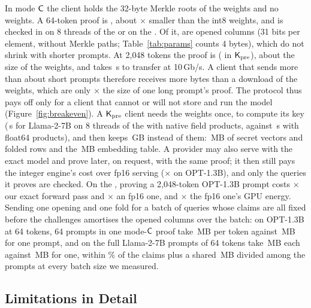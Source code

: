  In mode $\mathsf{C}$ the client holds the 32-byte Merkle roots of the weights and no weights.
A 64-token proof is \ProofLlamaShortC{}, about \ProofRatioLlamaShort{}$\times$ smaller than the int8
weights, and is checked in \VerifyLlamaShortCCpu{} on 8 threads of the \PlatformCpu{} or
\VerifyLlamaShortCGpu{} on the \PlatformGpu{}. Of it, \ColumnsLlamaShort{} are opened columns (31 bits per element, without Merkle paths;
Table~\ref{tab:params} counts 4 bytes), which do not shrink with shorter prompts. At 2{,}048 tokens the proof is \ProofLlamaLongC{}
(\ProofLlamaLongK{} in $\mathsf{K}_{\mathrm{pre}}$), about the size of the weights, and takes \TransferLlamaLong{}\,s to
transfer at 10\,Gb/s. A client that sends more than about \BreakevenQueriesShort{} short prompts
therefore receives more bytes than a download of the weights, which are only
\BreakevenQueriesLong{}$\times$ the size of one long prompt's proof. The protocol thus pays off only for a
client that cannot or will not store and run the model (Figure~\ref{fig:breakeven}). A $\mathsf{K}_{\mathrm{pre}}$ client needs the weights once, to compute its key
(\KpreKeyLlama{}\,s for Llama-2-7B on 8 threads of the \PlatformCpu{} with native field products, against
\KpreKeyLlamaBefore{}\,s with float64 products), and then keeps \KpreStoreGB{}\,GB instead of them:
\KpreKeyMB{}\,MB of secret vectors and folded rows and the \KpreEmbedMB{}\,MB embedding table. A provider may also serve with the exact model and prove
later, on request, with the same proof; it then still pays the integer engine's cost over fp16
serving (\ServeOptMUOneOverUTwo{}$\times$ on OPT-1.3B), and only the queries it proves are checked. On the \PlatformGpu{}, proving a 2{,}048-token OPT-1.3B prompt costs
\ServeOptMOverUOneRange{}$\times$ our exact forward pass and \ServeOptMOverUTwoRange{}$\times$ an fp16 one\TodoServingExt{}, and
\ServeOptMEnergyOverUTwoRange{}$\times$ the fp16 one's GPU energy. Sending one opening and one fold for a batch of
queries whose claims are all fixed before the challenges amortises the opened columns over the
batch: on OPT-1.3B at 64 tokens, 64 prompts in one mode-$\mathsf{C}$ proof take \ServeBatchMBPerTokenC{}\,MB per token
against \ServeSingleMBPerTokenC{}\,MB for one prompt, and on the full Llama-2-7B \BatchLlamaSize{} prompts of 64 tokens take
\BatchLlamaPerQuery{}\,MB each against \BatchLlamaSingle{}\,MB for one, within \BatchLlamaWithin{}\% of the claims plus a shared
\BatchLlamaShared{}\,MB divided among the prompts at every batch size we measured.

\subsection{Limitations in Detail}
\label{ext:disc-limits}

